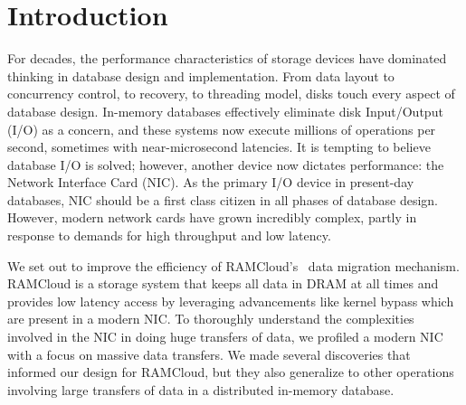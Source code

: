 
\chapter{Introduction}
\label{chap:intro}
For decades, the performance characteristics of storage devices have dominated
 thinking in database design and implementation. From data layout to
concurrency control, to recovery, to threading model, disks touch every aspect
of database design. In-memory databases effectively eliminate disk Input/Output (I/O) as a
concern, and these systems now execute millions of operations per second,
sometimes with near-microsecond latencies.  It is tempting to believe 
database I/O is solved; however, another device now dictates
performance: the Network Interface Card (NIC). As the primary I/O device in present-day databases,
NIC should be a first class citizen in all phases of database design.
However, modern network cards have grown incredibly complex, partly in response
to demands for high throughput and low latency.

We set out to improve the efficiency of RAMCloud's~\cite{ramcloud} data migration mechanism. 
RAMCloud is a storage system that keeps all data in DRAM at all times and provides low latency access by
leveraging advancements like kernel bypass which are present in a modern NIC.
To thoroughly understand the complexities involved in the NIC in doing huge
transfers of data, we profiled a modern NIC with a focus on massive data transfers.
 We made several discoveries that informed our design for RAMCloud,
 but they also generalize to other operations involving large transfers of data in a distributed in-memory database. 

